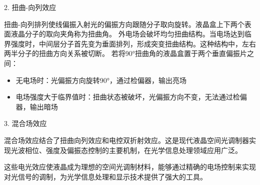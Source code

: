 \documentclass[11pt,a4paper]{article}
\begin{document}
2. 扭曲-向列效应

扭曲-向列排列使线偏振入射光的偏振方向跟随分子取向旋转。液晶盒上下两个表面液晶分子的取向夹角称为扭曲角。
外电场会破坏均匀扭曲结构。当电场达到临界强度时，中间层分子首先变为垂面排列，形成突变扭曲结构。这种结构中，左右两半分子的扭曲方向关系被切断。
若将90°扭曲角的液晶盒置于两个垂直偏振片之间：
\begin{itemize}
\item 无电场时：光偏振方向旋转90°，通过检偏器，输出亮场
\item 电场强度大于临界值时：扭曲状态被破坏，光偏振方向不变，无法通过检偏器，输出暗场
\end{itemize}

3. 混合场效应

混合场效应结合了扭曲向列效应和电控双折射效应。这是现代液晶空间光调制器实现光波相位、强度及偏振态控制的主要机制，在光学信息处理领域应用广泛。

这些电光效应使液晶成为理想的空间光调制材料，能够通过精确的电场控制来实现对光信号的调制，为光学信息处理和显示技术提供了强大的工具。
\end{document}

